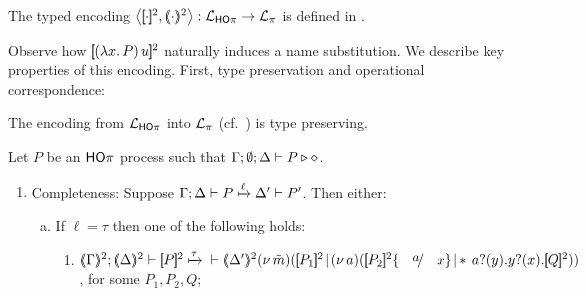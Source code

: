 \documentclass[runningheads]{llncs}
\begin{document}
{{%

\begin{definition}
\label{d:enc:hopitopi}
The typed encoding 
$\enco{\map{\cdot}^{2}, \mapt{\cdot}^{2} %
}: \tyl{L}_{\HOp} \to \tyl{L}_{\sessp}$  
is defined
in . 
\end{definition}


Observe how $[\!\![(\lambda x.\,P)\, {u}]\!\!]^2$ naturally induces a name substitution.
We describe key properties of this encoding. First, type preservation and operational correspondence:

\begin{proposition}
The encoding from $\mathcal{L}_{\mathsf{HO}\pi}$ into $\mathcal{L}_{\pi}$ (cf.~)
is type preserving.
\end{proposition}

\begin{proposition}%
	\label{prop:op_corr_HOp_to_p}
	Let $P$ be an  $\mathsf{HO}\pi$ process such that  $\Gamma; \emptyset; \Delta \vdash P \triangleright \diamond$.
	
\begin{enumerate}[1.]
\item Completeness: Suppose $\Gamma; \Delta \vdash P \xmapsto{\ell} \Delta' \vdash P'$. Then either:
				\begin{enumerate}[a)]
				\item If $\ell = \tau$ then one of the following holds:
				\begin{enumerate}[-]
					\item	 %
						$
						\horel{\tmap{\Gamma}{2}}{\tmap{\Delta}{2}}{\pmap{P}{2}}
						{\hby{\tau}} \\
						{\tmap{\Delta'}{2}}{}{\newsp{\tilde{m}}{\pmap{P_1}{2} \!\Par\! \newsp{a}
						{\pmap{P_2}{2}\subst{a}{x} \!\Par\!\! \repl{} \binp{a}{y} \binp{y}{x} \pmap{Q}{2}}}}
						$, for some  $P_1, P_2, Q$;


\end{enumerate}
\end{enumerate}
\end{enumerate}
\end{proposition}}}
\end{document}
